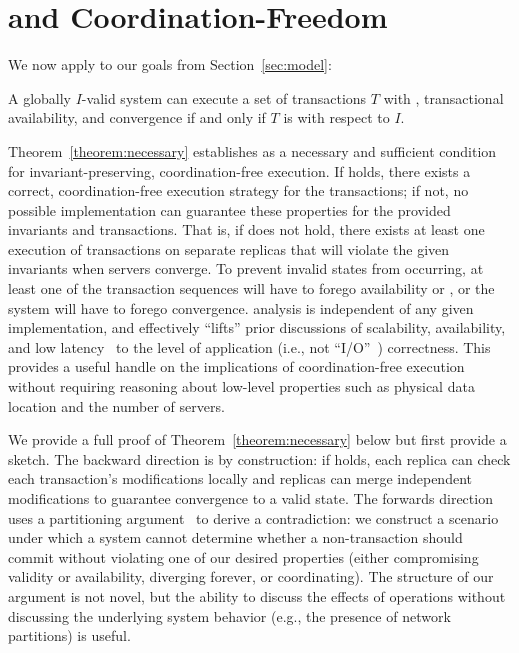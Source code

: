 \section{\IConfluence and Coordination-Freedom}
\label{sec:ic-result}

We now apply \iconfluence to our goals from Section~\ref{sec:model}:

\begin{theorem}
\label{theorem:necessary}
A globally $I$-valid system can execute a set of transactions $T$ with
\cfreedom, transactional availability, and convergence if and only if $T$
is \iconfluent with respect to $I$.
\end{theorem}

Theorem~\ref{theorem:necessary} establishes \iconfluence as a
necessary and sufficient condition for invariant-preserving,
coordination-free execution.  If \iconfluence holds, there exists a
correct, coordination-free execution strategy for the transactions; if
not, no possible implementation can guarantee these properties for the
provided invariants and transactions. That is, if \iconfluence does
not hold, there exists at least one execution of transactions on
separate replicas that will violate the given invariants when servers
converge. To prevent invalid states from occurring, at least one of
the transaction sequences will have to forego availability or
\cfreedom, or the system will have to forego convergence. \Iconfluence
analysis is independent of any given implementation, and effectively
``lifts'' prior discussions of scalability, availability, and low
latency~\cite{hat-vldb,gilbert-cap,pacelc} to the level of application
(i.e., not ``I/O''~\cite{consistency-borders}) correctness. This
provides a useful handle on the implications of coordination-free
execution without requiring reasoning about low-level properties such
as physical data location and the number of servers.

We provide a full proof of Theorem~\ref{theorem:necessary} below but
first provide a sketch. The backward direction is by construction: if
\iconfluence holds, each replica can check each transaction's
modifications locally and replicas can merge independent modifications
to guarantee convergence to a valid state. The forwards direction uses
a partitioning argument~\cite{gilbert-cap} to derive a contradiction:
we construct a scenario under which a system cannot determine whether
a non-\iconfluent transaction should commit without violating one of
our desired properties (either compromising validity or availability,
diverging forever, or coordinating). The structure of our
argument is not novel, but the ability to discuss the effects of
operations without discussing the underlying system behavior (e.g.,
the presence of network partitions) is useful.

